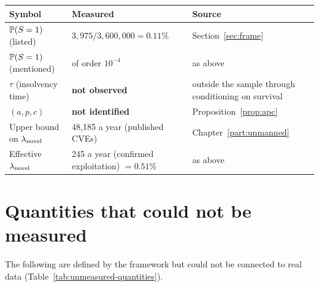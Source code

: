 \begin{center}
\begin{tabularx}{\textwidth}{@{}llX@{}}
\toprule
Symbol & Measured & Source \\
\midrule
$\mathbb{P}(S=1)$ (listed) & $3{,}975 / 3{,}600{,}000 = 0.11\%$ & Section~\ref{sec:frame} \\
$\mathbb{P}(S=1)$ (mentioned) & of order $10^{-4}$ & as above \\
$\tau$ (insolvency time) & \textbf{not observed} & outside the sample through conditioning on survival \\
$(a,p,c)$ & \textbf{not identified} & Proposition~\ref{prop:apc} \\
Upper bound on $\lambda_{\rm novel}$ & 48{,}185 a year (published CVEs) & Chapter~\ref{part:unmanned} \\
Effective $\lambda_{\rm novel}$ & 245 a year (confirmed exploitation) $=0.51\%$ & as above \\
\bottomrule
\end{tabularx}
\label{tab:selection-identification-measures}
\end{center}

\section{Quantities that could not be measured}

The following are defined by the framework but could not be connected to real data
(Table~\ref{tab:unmeasured-quantities}).

